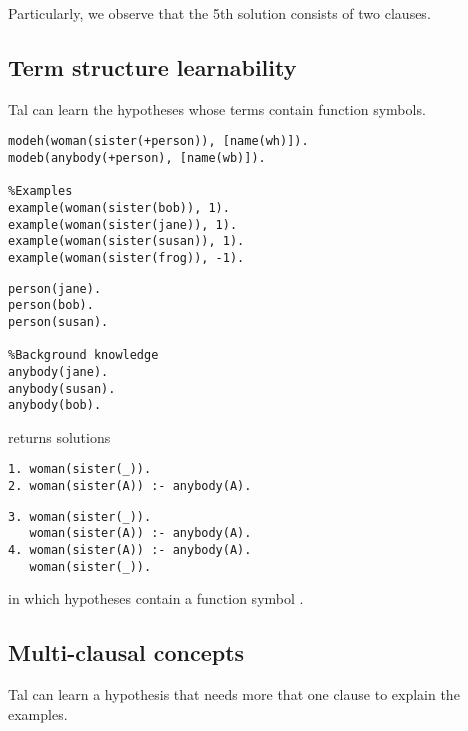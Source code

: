 \begin{lstlisting}
\end{lstlisting}

Particularly, we observe that the 5th solution consists of two clauses.

\subsection{Term structure learnability}
Tal can learn the hypotheses whose terms contain function symbols.

\begin{minipage}[t]{.60\textwidth}
\begin{lstlisting}
modeh(woman(sister(+person)), [name(wh)]).
modeb(anybody(+person), [name(wb)]).

%Examples
example(woman(sister(bob)), 1).
example(woman(sister(jane)), 1).
example(woman(sister(susan)), 1).
example(woman(sister(frog)), -1).
\end{lstlisting}
\end{minipage}
\begin{minipage}[t]{.20\textwidth}
\begin{lstlisting}
person(jane).
person(bob).
person(susan).

%Background knowledge
anybody(jane).
anybody(susan).
anybody(bob).
\end{lstlisting}
\end{minipage}

returns solutions

\begin{minipage}[t]{.50\textwidth}
\begin{lstlisting}
1. woman(sister(_)).
2. woman(sister(A)) :- anybody(A).
\end{lstlisting}
\end{minipage}
\begin{minipage}[t]{.20\textwidth}
\begin{lstlisting}
3. woman(sister(_)).
   woman(sister(A)) :- anybody(A).
4. woman(sister(A)) :- anybody(A).
   woman(sister(_)).
\end{lstlisting}
\end{minipage}

in which hypotheses contain a function symbol .

\subsection{Multi-clausal concepts}
Tal can learn a hypothesis that needs more that one clause to explain the examples.

